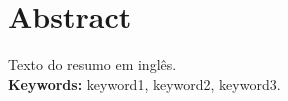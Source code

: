 \chapter*{Abstract}
Texto do resumo em inglês. \\[1em]
\textbf{Keywords:} keyword1, keyword2, keyword3.
\newpage